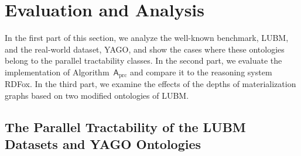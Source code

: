 \section{Evaluation and Analysis}
\label{sec:evaluation}

In the first part of this section, we analyze the well-known benchmark, LUBM,
and the real-world dataset, YAGO, and
show the cases where these ontologies belong to the parallel tractability classes.
%
In the second part, we evaluate the implementation of Algorithm~$\mathsf{A}_{\text{prc}}$
and compare it to the reasoning system RDFox.
%
In the third part, we examine the effects of the depths of materialization graphs
based on two modified ontologies of LUBM.



\subsection{The Parallel Tractability of the LUBM Datasets and YAGO Ontologies}
\label{sec:lubm-yago}

